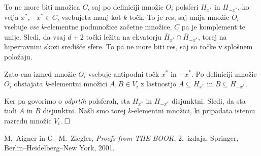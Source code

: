 \documentclass[a4paper,12pt]{article}
\def\qed{$\hfill\Box$}   %
\begin{document}
To ne more biti množica $C$, saj po definiciji množic $O_i$ polsferi $H_{x^*}$ in $H_{-x^*}$, ko velja $x^*, -x^* \in C$, vsebujeta manj kot $k$ točk. To je res, saj unija množic $O_i$ vsebuje {\em vse} $k$-elementne podmnožice začetne množice, $C$ pa je komplement te unije. Sledi, da vsaj $d+2$ točki ležita na ekvatorju $\overline H_{x^*} \cap \overline H_{-x^*}$, torej na hiperravnini skozi središče sfere. To pa ne more biti res, saj so točke v splošnem položaju.

Zato ena izmed množic $O_i$ vsebuje antipodni točk $x^*$ in $-x^*$. Po definiciji množic $O_i$  obstajata \mbox{$k$-elementni} množici $A, B \in V_i$ z lastnostjo $A \subseteq H_{x^*}$ in $B \subseteq H_{-x^*}$. 

Ker pa govorimo o {\em odprtih} polsferah, sta $H_{x^*}$ in $H_{-x^*}$ disjunktni. Sledi, da sta tudi $A$ in $B$ disjunktni. Našli smo torej $k$-elementni množici, ki pripadata istemu razredu množic $V_i$. \qed



\begin{thebibliography}{1}

M.~Aigner in G.~M.~Ziegler, \emph{Proofs from THE BOOK}, 2.\ izdaja, Springer, Berlin--Heidelberg--New York, 2001.

\end{thebibliography}
\end{document}
